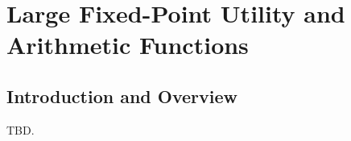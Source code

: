 \chapter{Large Fixed-Point Utility and Arithmetic Functions}
\label{cfpa2}

\section{Introduction and Overview}
\label{cfpa2:siov0}

TBD.


